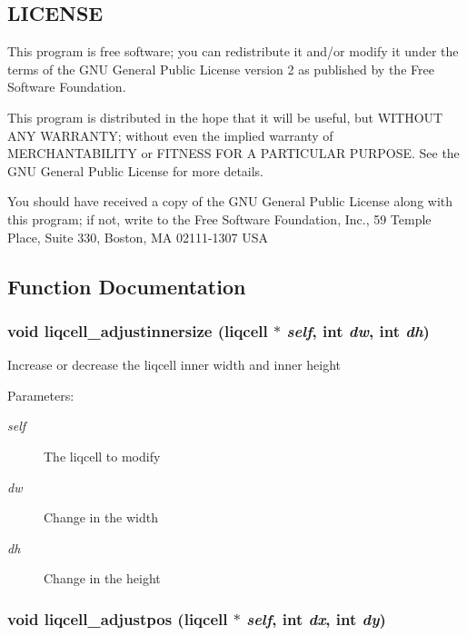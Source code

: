 \subsection{LICENSE}\label{d7/db4/liqcell__prop_8c_LICENSE}
This program is free software; you can redistribute it and/or modify it under the terms of the GNU General Public License version 2 as published by the Free Software Foundation.

This program is distributed in the hope that it will be useful, but WITHOUT ANY WARRANTY; without even the implied warranty of MERCHANTABILITY or FITNESS FOR A PARTICULAR PURPOSE. See the GNU General Public License for more details.

You should have received a copy of the GNU General Public License along with this program; if not, write to the Free Software Foundation, Inc., 59 Temple Place, Suite 330, Boston, MA 02111-1307 USA 

\subsection{Function Documentation}
\subsubsection[{liqcell\_\-adjustinnersize}]{\setlength{\rightskip}{0pt plus 5cm}void liqcell\_\-adjustinnersize (liqcell $\ast$ {\em self}, \/  int {\em dw}, \/  int {\em dh})}\label{d5/da2/liqcell_8c_43f97de0c4ed635784d01d0ab49c5c3b}


Increase or decrease the liqcell inner width and inner height \begin{Desc}
\item[Parameters:]
\begin{description}
\item[{\em self}]The liqcell to modify \item[{\em dw}]Change in the width \item[{\em dh}]Change in the height \end{description}
\end{Desc}
\subsubsection[{liqcell\_\-adjustpos}]{\setlength{\rightskip}{0pt plus 5cm}void liqcell\_\-adjustpos (liqcell $\ast$ {\em self}, \/  int {\em dx}, \/  int {\em dy})}\label{d5/da2/liqcell_8c_f19ddc03ffabda4c6cd3d627beeaca50}


